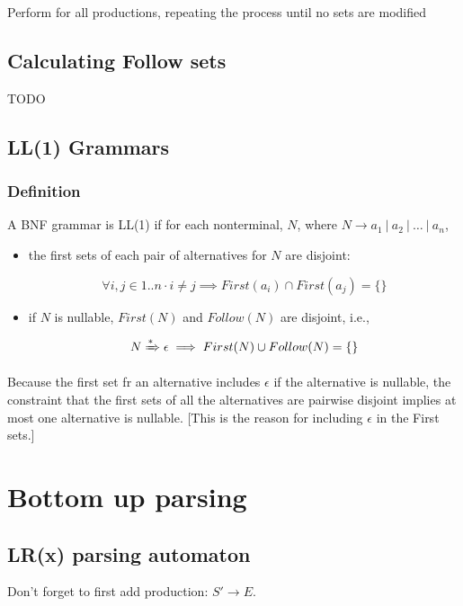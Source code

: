 \documentclass[fontsize=10pt,a4paper]{article}
\begin{document}
\begin{multicols}{3}
    Perform for all productions, repeating the process until no sets are modified

    \subsection{Calculating Follow sets}

    TODO

    \subsection{LL(1) Grammars}

    \subsubsection{Definition}

    A BNF grammar is LL(1) if for each nonterminal, $N$, where $N \rightarrow a_1 ~\vert~ a_2 ~\vert~ \dots ~\vert~ a_n$,

    \begin{itemize}
        \item the first sets of each pair of alternatives for $N$ are disjoint:

        \[\forall i, j \in 1..n \cdot i \neq j \implies First(a_i) \cap First(a_j) = \{\}\]

        \item if $N$ is nullable, $First(N)$ and $Follow(N)$ are disjoint, i.e.,

        \[N \xRightarrow{*} \epsilon \implies First(N) \cup Follow(N) = \{\}\]

    \end{itemize}

    Because the first set fr an alternative includes $\epsilon$ if the alternative is nullable, the constraint that the first sets of all the alternatives are pairwise disjoint implies at most one alternative is nullable. [This is the reason for including $\epsilon$ in the First sets.]
    

    \section{Bottom up parsing}

    \subsection{LR(x) parsing automaton}

    Don't forget to first add production: $S' \rightarrow E$.


\end{multicols}
\end{document}
